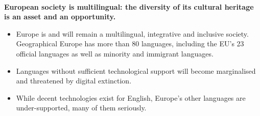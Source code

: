 \documentclass[10pt, plain]{../../metanetpaper}
\begin{document}
\medskip
\centerline{\small{}}

\vfill

~

\clearpage



\renewcommand\contentsname{}
\tableofcontents


\cleardoublepage


\setcounter{page}{1}
\pagestyle{scrheadings}




{\color{red}\textsf{\fontsize{24}{24}\selectfont{KEY MESSAGES}}}

\bigskip
\textbf{European society is multilingual: the diversity of its cultural heritage is an asset and an opportunity.}
\begin{itemize}
\item Europe is and will remain a multilingual, integrative and inclusive society. Geographical Europe has more than 80 languages, including the EU’s 23 official languages as well as minority and immigrant languages.
\item Languages without sufficient technological support will become marginalised and threatened by digital extinction.
\item While decent technologies exist for English, Europe's other languages are under-supported, many of them seriously.
\end{itemize}
\end{document}
